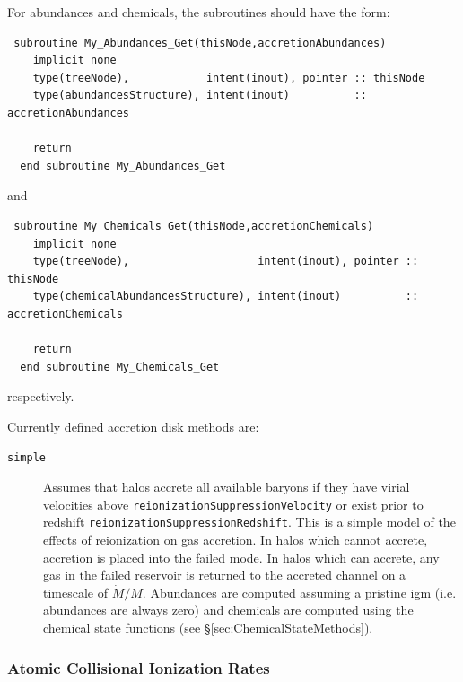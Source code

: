 For abundances and chemicals, the subroutines should have the form:
\begin{verbatim}
 subroutine My_Abundances_Get(thisNode,accretionAbundances)
    implicit none
    type(treeNode),            intent(inout), pointer :: thisNode
    type(abundancesStructure), intent(inout)          :: accretionAbundances

    return
  end subroutine My_Abundances_Get
\end{verbatim}
and
\begin{verbatim}
 subroutine My_Chemicals_Get(thisNode,accretionChemicals)
    implicit none
    type(treeNode),                    intent(inout), pointer :: thisNode
    type(chemicalAbundancesStructure), intent(inout)          :: accretionChemicals

    return
  end subroutine My_Chemicals_Get
\end{verbatim}
respectively.

Currently defined accretion disk methods are:
\begin{description}
 \item [{\tt simple}] Assumes that halos accrete all available baryons if they have virial velocities above {\tt reionizationSuppressionVelocity} or exist prior to redshift {\tt reionizationSuppressionRedshift}. This is a simple model of the effects of reionization on gas accretion. In halos which cannot accrete, accretion is placed into the failed mode. In halos which can accrete, any gas in the failed reservoir is returned to the accreted channel on a timescale of $\dot{M}/M$. Abundances are computed assuming a pristine \gls{igm} (i.e. abundances are always zero) and chemicals are computed using the chemical state functions (see \S\ref{sec:ChemicalStateMethods}).
\end{description}

\subsubsection{Atomic Collisional Ionization Rates}

